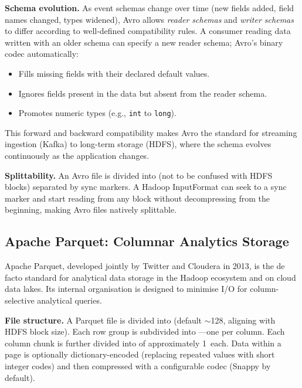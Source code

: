 \textbf{Schema evolution.} As event schemas change over time (new
fields added, field names changed, types widened), Avro allows
\emph{reader schemas} and \emph{writer schemas} to differ according
to well-defined compatibility rules. A consumer reading data written
with an older schema can specify a new reader schema; Avro's binary
codec automatically:
\begin{itemize}
  \item Fills missing fields with their declared default values.
  \item Ignores fields present in the data but absent from the reader schema.
  \item Promotes numeric types (e.g., \texttt{int} to \texttt{long}).
\end{itemize}
This forward and backward compatibility makes Avro the standard for
streaming ingestion (Kafka) to long-term storage (HDFS), where the
schema evolves continuously as the application changes.

\textbf{Splittability.} An Avro file is divided into 
(not to be confused with HDFS blocks) separated by sync markers. A
Hadoop InputFormat can seek to a sync marker and start reading from
any block without decompressing from the beginning, making Avro files
natively splittable.

\subsection{Apache Parquet: Columnar Analytics Storage}
\label{subsec:parquet}

Apache Parquet, developed jointly by Twitter and Cloudera in 2013, is
the de facto standard for analytical data storage in the Hadoop
ecosystem and on cloud data lakes. Its internal organisation is
designed to minimise I/O for column-selective analytical queries.

\textbf{File structure.} A Parquet file is divided into  (default $\sim$128\MB, aligning with HDFS block size). Each
row group is subdivided into ---one per column.
Each column chunk is further divided into  of approximately
1\MB\ each. Data within a page is optionally dictionary-encoded
(replacing repeated values with short integer codes) and then
compressed with a configurable codec (Snappy by default).

